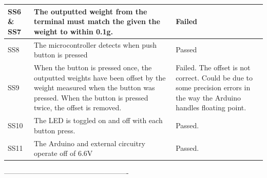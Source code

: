\documentclass[class=report,11pt,crop=false]{standalone}
\begin{document}
\begin{longtable}[c]{|p{}|p{}|p{}|}
		SS6 \& SS7                   & The outputted   weight from the terminal must match the given the weight to within 0.1g.                                                                                                   & Failed                                                                                                                      \\ \hline
		SS8                          & The   microcontroller detects when push button is pressed                                                                                                                                  & Passed                                                                                                                      \\ \hline
		SS9                          & When the   button is pressed once, the outputted weights have been offset by the weight   measured when the button was pressed. When the button is pressed twice, the   offset is removed. & Failed.   The offset is not correct. Could be due to some precision errors in the way   the Arduino handles floating point. \\ \hline
		SS10                         & The LED is   toggled on and off with each button press.                                                                                                                                    & Passed.                                                                                                                     \\ \hline
		SS11                         & The Arduino   and external circuitry operate off of 6.6V                                                                                                                                   & Passed.                                                                                                                     \\ \hline
	\end{longtable}
	
	 ----------------------------------------------------
	\ifstandalone
	
	\printnoidxglossary[type=\acronymtype,nonumberlist]
	\fi
\end{document}
